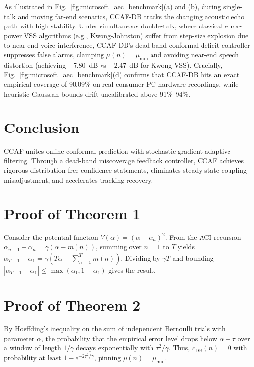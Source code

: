 \documentclass[journal,twocolumn]{IEEEtran}
\begin{document}
As illustrated in Fig.~\ref{fig:microsoft_aec_benchmark}(a) and (b), during single-talk and moving far-end scenarios, CCAF-DB tracks the changing acoustic echo path with high stability. Under simultaneous double-talk, where classical error-power VSS algorithms (e.g., Kwong-Johnston) suffer from step-size explosion due to near-end voice interference, CCAF-DB's dead-band conformal deficit controller suppresses false alarms, clamping $\mu(n) = \mu_{\min}$ and avoiding near-end speech distortion (achieving $-7.80$~dB vs $-2.47$~dB for Kwong VSS). Crucially, Fig.~\ref{fig:microsoft_aec_benchmark}(d) confirms that CCAF-DB hits an exact empirical coverage of 90.09\% on real consumer PC hardware recordings, while heuristic Gaussian bounds drift uncalibrated above 91\%--94\%.

\section{Conclusion}
CCAF unites online conformal prediction with stochastic gradient adaptive filtering. Through a dead-band miscoverage feedback controller, CCAF achieves rigorous distribution-free confidence statements, eliminates steady-state coupling misadjustment, and accelerates tracking recovery.

\appendices
\section{Proof of Theorem 1}
Consider the potential function $V(\alpha) = (\alpha - \alpha_n)^2$. From the ACI recursion $\alpha_{n+1} - \alpha_n = \gamma(\alpha - m(n))$, summing over $n=1$ to $T$ yields $\alpha_{T+1} - \alpha_1 = \gamma \left( T \alpha - \sum_{n=1}^T m(n) \right)$. Dividing by $\gamma T$ and bounding $|\alpha_{T+1} - \alpha_1| \le \max(\alpha_1, 1-\alpha_1)$ gives the result.

\section{Proof of Theorem 2}
By Hoeffding's inequality on the sum of independent Bernoulli trials with parameter $\alpha$, the probability that the empirical error level drops below $\alpha - \tau$ over a window of length $1/\gamma$ decays exponentially with $\tau^2/\gamma$. Thus, $c_{\text{DB}}(n) = 0$ with probability at least $1 - e^{-2\tau^2/\gamma}$, pinning $\mu(n) = \mu_{\min}$.



\end{document}
